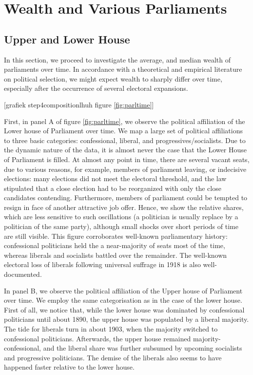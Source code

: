 \section{Wealth and Various Parliaments}

\subsection{Upper and Lower House}
    In this section, we proceed to investigate the average, and median wealth of parliaments over time. In accordance with a theoretical and empirical literature on political selection, we might expect wealth to sharply differ over time, especially after the occurrence of several electoral expansions. 
\begin{center}
    [grafiek step4compositionlhuh figure \ref{fig:parltime}]
\end{center}

    First, in panel A of figure \ref{fig:parltime}, we observe the political affiliation of the Lower house of Parliament over time. We map a large set of political affiliations to three basic categories: confessional, liberal, and progressives/socialists. Due to the dynamic nature of the data, it is almost never the case that the Lower House of Parliament is filled. At almost any point in time, there are several vacant seats, due to various reasons, for example, members of parliament leaving, or indecisive elections: many elections did not meet the electoral threshold, and the law stipulated that a close election had to be reorganized with only the close candidates contending. Furthermore, members of parliament could be tempted to resign in face of another attractive job offer. Hence, we show the relative shares, which are less sensitive to such oscillations (a politician is usually replace by a politician of the same party), although small shocks over short periods of time are still visible. This figure corroborates well-known parliamentary history: confessional politicians held the a near-majority of seats most of the time, whereas liberals and socialists battled over the remainder. The well-known electoral loss of liberals following universal suffrage in 1918 is also well-documented. \autocite{van2018tussen} 
    
    In panel B, we observe the political affiliation of the Upper house of Parliament over time. We employ the same categorisation as in the case of the lower house. First of all, we notice that, while the lower house was dominated by confessional politicians until about 1890, the upper house was populated by a liberal majority. The tide for liberals turn in about 1903, when the majority switched to confessional politicians. Afterwards, the upper house remained majority-confessional, and the liberal share was further subsumed by upcoming socialists and progressive politicians. The demise of the liberals also seems to have happened faster relative to the lower house. 
    
